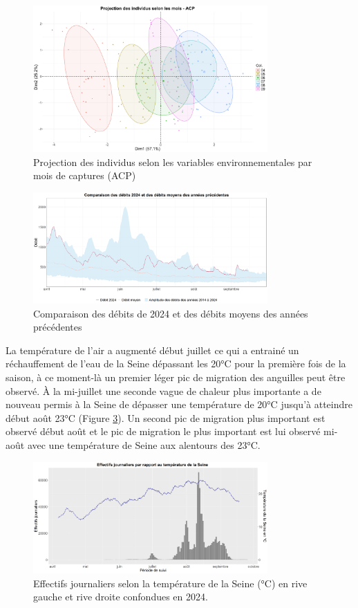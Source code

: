 \documentclass[11pt,titlepage,twoside]{article}\usepackage[]{graphicx}\usepackage[table]{xcolor}
\begin{document}
\begin{figure}[htpb]
\centering
\includegraphics[width=0.8\textwidth]{Individus.png}
\caption{Projection des individus selon les variables environnementales par mois de captures (ACP)}
\label{Individus}
\end{figure} 

\begin{figure}[htpb]
\centering
\includegraphics[width=0.8\textwidth]{graph_debit_oral.png}
\caption{Comparaison des débits de 2024 et des débits moyens des années précédentes}
\label{graph_debit_oral}
\end{figure} 

La température de l’air a augmenté début juillet ce qui a entrainé un réchauffement de l’eau de la Seine dépassant les 20°C pour la première fois de la saison, à ce moment-là un premier léger pic de migration des anguilles peut être observé. À la mi-juillet une seconde vague de chaleur plus importante a de nouveau permis à la Seine de dépasser une température de 20°C jusqu’à atteindre début août 23°C (Figure \ref{graph_temp_eau_oral}). Un second pic de migration plus important est observé début août et le pic de migration le plus important est lui observé mi-août avec une température de Seine aux alentours des 23°C.


\begin{figure}[htpb]
\centering
\includegraphics[width=0.8\textwidth]{graph_temp_eau_oral.png}
\caption{Effectifs journaliers selon la température de la Seine (°C) en rive gauche et rive droite confondues en 2024.}
\label{graph_temp_eau_oral}
\end{figure} 
\end{document}
